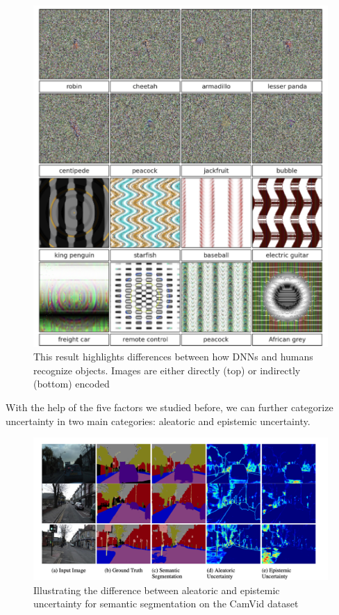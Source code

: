 \begin{figure}[htb]
    \centering
    \includegraphics[scale = 0.4]{img/images_fooling_DNN.png}
    \caption[Differences between how DNNs and humans recognize objects]{This result highlights differences between how DNNs and humans recognize objects. Images are either directly (top) or indirectly (bottom) encoded \cite{nguyen2015deep}}
    \label{fig:fooling_DNN}
\end{figure}

With the help of the five factors we studied before, we can further categorize uncertainty in two main categories: aleatoric and epistemic uncertainty. \cite{Separation_uncer}

\begin{figure}[htb]
    \includegraphics[scale = 0.4]{img/uncert_visua.png}
    \caption[Illustrating the difference between aleatoric and epistemic uncertainty]{Illustrating the difference between aleatoric and epistemic uncertainty for semantic segmentation on the CamVid dataset \cite{DBLP:journals/corr/abs-1811-01412}}
    \label{fig:un_visua}
\end{figure}

